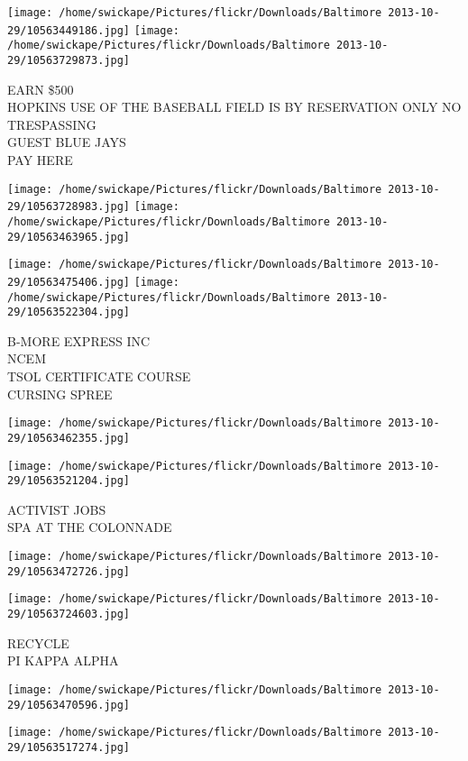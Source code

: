 \documentclass[10pt,letterpaper]{article}
\begin{document}
\texttt{[image: /home/swickape/Pictures/flickr/Downloads/Baltimore 2013-10-29/10563449186.jpg]}
\texttt{[image: /home/swickape/Pictures/flickr/Downloads/Baltimore 2013-10-29/10563729873.jpg]}

EARN \$500\\
HOPKINS USE OF THE BASEBALL FIELD IS BY RESERVATION ONLY NO TRESPASSING\\
GUEST BLUE JAYS\\
PAY HERE
\pagebreak

\texttt{[image: /home/swickape/Pictures/flickr/Downloads/Baltimore 2013-10-29/10563728983.jpg]}
\texttt{[image: /home/swickape/Pictures/flickr/Downloads/Baltimore 2013-10-29/10563463965.jpg]}

\texttt{[image: /home/swickape/Pictures/flickr/Downloads/Baltimore 2013-10-29/10563475406.jpg]}
\texttt{[image: /home/swickape/Pictures/flickr/Downloads/Baltimore 2013-10-29/10563522304.jpg]}

B{-}MORE EXPRESS INC\\
NCEM\\
TSOL CERTIFICATE COURSE\\
CURSING SPREE
\pagebreak

\texttt{[image: /home/swickape/Pictures/flickr/Downloads/Baltimore 2013-10-29/10563462355.jpg]}

\vspace{0.25in}
\texttt{[image: /home/swickape/Pictures/flickr/Downloads/Baltimore 2013-10-29/10563521204.jpg]}

ACTIVIST JOBS\\
SPA AT THE COLONNADE
\pagebreak

\texttt{[image: /home/swickape/Pictures/flickr/Downloads/Baltimore 2013-10-29/10563472726.jpg]}

\vspace{0.25in}
\texttt{[image: /home/swickape/Pictures/flickr/Downloads/Baltimore 2013-10-29/10563724603.jpg]}

RECYCLE\\
PI KAPPA ALPHA
\pagebreak

\texttt{[image: /home/swickape/Pictures/flickr/Downloads/Baltimore 2013-10-29/10563470596.jpg]}

\vspace{0.25in}
\texttt{[image: /home/swickape/Pictures/flickr/Downloads/Baltimore 2013-10-29/10563517274.jpg]}
\end{document}
